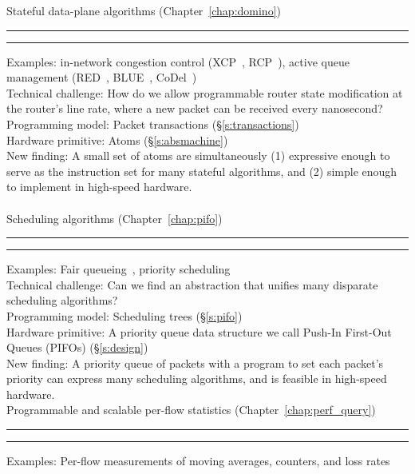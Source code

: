 \begin{table}
\begin{small}
Stateful data-plane algorithms (Chapter~\ref{chap:domino})
\hrule \hrule
Examples: in-network congestion control (XCP~\cite{xcp}, RCP~\cite{rcp}), active
queue management (RED~\cite{red}, BLUE~\cite{blue}, CoDel~\cite{codel}) \\

Technical challenge: How do we allow programmable router state modification at
the router's line rate, where a new packet can be received every nanosecond? \\

Programming model: Packet transactions (\S\ref{s:transactions})\\

Hardware primitive: Atoms (\S\ref{s:absmachine}) \\

New finding: A small set of atoms are simultaneously (1) expressive enough to
serve as the instruction set for many stateful algorithms, and (2) simple
enough to implement in high-speed hardware. \\ \\

Scheduling algorithms (Chapter~\ref{chap:pifo})
\hrule \hrule
Examples: Fair queueing~\cite{wfq}, priority scheduling~\cite{srpt} \\

Technical challenge: Can we find an abstraction that unifies many disparate
scheduling algorithms? \\

Programming model: Scheduling trees (\S\ref{s:pifo}) \\

Hardware primitive: A priority queue data structure we call Push-In First-Out
Queues (PIFOs) (\S\ref{s:design}) \\

New finding: A priority queue of packets with a program to set each packet's
priority can express many scheduling algorithms, and is feasible in high-speed
hardware. \\

Programmable and scalable per-flow statistics (Chapter~\ref{chap:perf_query}) \\
\hrule \hrule
Examples: Per-flow measurements of moving averages, counters, and loss rates \\


\end{small}
\end{table}
